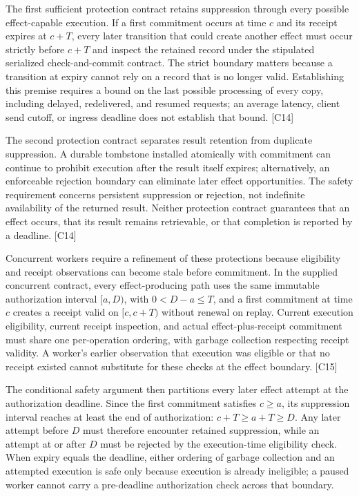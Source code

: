 \documentclass[11pt]{article}
\begin{document}
The first sufficient protection contract retains suppression through every possible effect-capable execution. If a first commitment occurs at time $c$ and its receipt expires at $c+T$, every later transition that could create another effect must occur strictly before $c+T$ and inspect the retained record under the stipulated serialized check-and-commit contract. The strict boundary matters because a transition at expiry cannot rely on a record that is no longer valid. Establishing this premise requires a bound on the last possible processing of every copy, including delayed, redelivered, and resumed requests; an average latency, client send cutoff, or ingress deadline does not establish that bound. [C14]

The second protection contract separates result retention from duplicate suppression. A durable tombstone installed atomically with commitment can continue to prohibit execution after the result itself expires; alternatively, an enforceable rejection boundary can eliminate later effect opportunities. The safety requirement concerns persistent suppression or rejection, not indefinite availability of the returned result. Neither protection contract guarantees that an effect occurs, that its result remains retrievable, or that completion is reported by a deadline. [C14]

Concurrent workers require a refinement of these protections because eligibility and receipt observations can become stale before commitment. In the supplied concurrent contract, every effect-producing path uses the same immutable authorization interval $[a,D)$, with $0<D-a\leq T$, and a first commitment at time $c$ creates a receipt valid on $[c,c+T)$ without renewal on replay. Current execution eligibility, current receipt inspection, and actual effect-plus-receipt commitment must share one per-operation ordering, with garbage collection respecting receipt validity. A worker\textquoteright{}s earlier observation that execution was eligible or that no receipt existed cannot substitute for these checks at the effect boundary. [C15]

The conditional safety argument then partitions every later effect attempt at the authorization deadline. Since the first commitment satisfies $c\geq a$, its suppression interval reaches at least the end of authorization: $c+T\geq a+T\geq D$. Any later attempt before $D$ must therefore encounter retained suppression, while an attempt at or after $D$ must be rejected by the execution-time eligibility check. When expiry equals the deadline, either ordering of garbage collection and an attempted execution is safe only because execution is already ineligible; a paused worker cannot carry a pre-deadline authorization check across that boundary.
\end{document}
